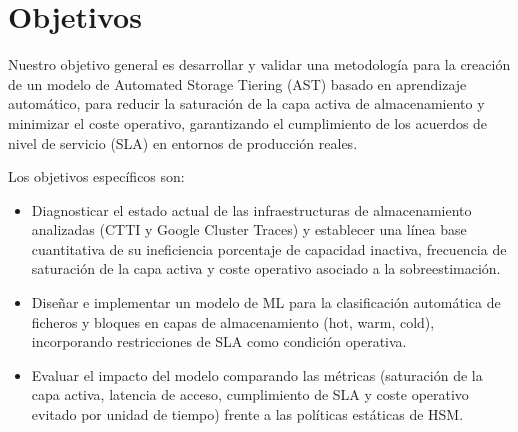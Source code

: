 \section{Objetivos}
Nuestro objetivo general es desarrollar y validar una metodología para la creación de un modelo de Automated Storage Tiering (AST) basado en aprendizaje automático,
para reducir la saturación de la capa activa de almacenamiento y minimizar el coste operativo, garantizando el cumplimiento de los acuerdos de nivel de servicio (SLA) en entornos de producción reales.


Los objetivos específicos son:
\begin{itemize}
    \item Diagnosticar el estado actual de las infraestructuras de almacenamiento analizadas (CTTI y Google Cluster Traces) y establecer una línea base cuantitativa de su ineficiencia porcentaje de capacidad inactiva, frecuencia de saturación de la capa activa y coste operativo asociado a la sobreestimación.
    \item Diseñar e implementar un modelo de ML para la clasificación automática de ficheros y bloques en capas de almacenamiento (hot, warm, cold), incorporando restricciones de SLA como condición operativa.
    \item Evaluar el impacto del modelo comparando las métricas (saturación de la capa activa, latencia de acceso, cumplimiento de SLA y coste operativo evitado por unidad de tiempo) frente a las políticas estáticas de HSM.
\end{itemize}


